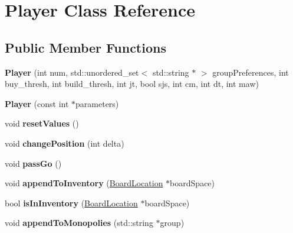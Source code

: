 \hypertarget{classPlayer}{\section{Player Class Reference}
\label{classPlayer}
}
\subsection*{Public Member Functions}
\begin{DoxyCompactItemize}
\item 
\hypertarget{classPlayer_a6033e162a213ba2c1e4a6f3e915c1db8}{{\bfseries Player} (int num, std\-::unordered\-\_\-set$<$ std\-::string $\ast$ $>$ group\-Preferences, int buy\-\_\-thresh, int build\-\_\-thresh, int jt, bool sjs, int cm, int dt, int maw)}\label{classPlayer_a6033e162a213ba2c1e4a6f3e915c1db8}

\item 
\hypertarget{classPlayer_a0a33239060794c4f3cf6b1c147b16409}{{\bfseries Player} (const int $\ast$parameters)}\label{classPlayer_a0a33239060794c4f3cf6b1c147b16409}

\item 
\hypertarget{classPlayer_a4015e9d0d9878066bab0636d24841dea}{void {\bfseries reset\-Values} ()}\label{classPlayer_a4015e9d0d9878066bab0636d24841dea}

\item 
\hypertarget{classPlayer_a572510cbf0ed3bd805d6498b53e58e9f}{void {\bfseries change\-Position} (int delta)}\label{classPlayer_a572510cbf0ed3bd805d6498b53e58e9f}

\item 
\hypertarget{classPlayer_a5ae963bb546d7dc2796cd9c59dcc6f23}{void {\bfseries pass\-Go} ()}\label{classPlayer_a5ae963bb546d7dc2796cd9c59dcc6f23}

\item 
\hypertarget{classPlayer_af668ae80ca4c5d6329e170ee719bbdce}{void {\bfseries append\-To\-Inventory} (\hyperlink{classBoardLocation}{Board\-Location} $\ast$board\-Space)}\label{classPlayer_af668ae80ca4c5d6329e170ee719bbdce}

\item 
\hypertarget{classPlayer_acbe8c228cdaf47a437202aa64438de2f}{bool {\bfseries is\-In\-Inventory} (\hyperlink{classBoardLocation}{Board\-Location} $\ast$board\-Space)}\label{classPlayer_acbe8c228cdaf47a437202aa64438de2f}

\item 
\hypertarget{classPlayer_a78e1821e652618f538f774fc5c867559}{void {\bfseries append\-To\-Monopolies} (std\-::string $\ast$group)}\label{classPlayer_a78e1821e652618f538f774fc5c867559}


\end{DoxyCompactItemize}
